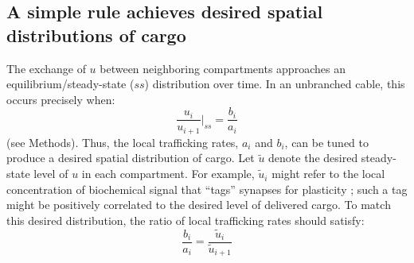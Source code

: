 \documentclass[10pt]{wlpeerj}
\begin{document}
\subsection*{A simple rule achieves desired spatial distributions of cargo}

The exchange of $u$ between neighboring compartments approaches an equilibrium/steady-state ($ss$) distribution over time. In an unbranched cable, this occurs precisely when:
\begin{equation}
\frac{u_i}{u_{i+1}} \Bigg|_{ss} = \frac{b_i}{a_i}
\end{equation}
(see Methods). Thus, the local trafficking rates, $a_i$ and $b_i$, can be tuned to produce a desired spatial distribution of cargo. Let $\tilde{u}$ denote the desired steady-state level of $u$ in each compartment. For example, $\tilde{u}_i$ might refer to the local concentration of biochemical signal that ``tags'' synapses for plasticity \citep{Frey_1997}; such a tag might be positively correlated to the desired level of delivered cargo. To match this desired distribution, the ratio of local trafficking rates should satisfy:
\begin{equation}
\frac{b_i}{a_i} = \frac{\tilde{u}_i}{\tilde{u}_{i+1}}
\end{equation}
\end{document}
